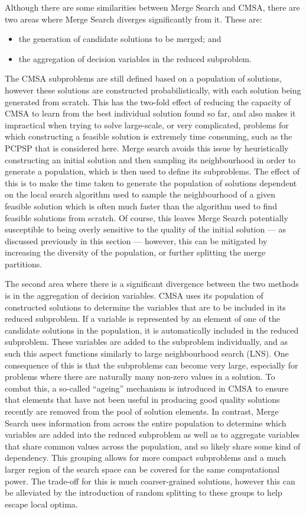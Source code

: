 \documentclass[authoryear,11pt,square,number,times,super,comma]{elsarticle}
\begin{document}
Although there are some similarities between Merge Search and CMSA, there are two areas where Merge Search diverges significantly from it. These are:
\begin{itemize}
\item the generation of candidate solutions to be merged; and
\item the aggregation of decision variables in the reduced subproblem.
\end{itemize}
The CMSA subproblems are still defined based on a population of solutions, however these solutions are constructed probabilistically, with each solution being generated from scratch. This has the two-fold effect of reducing the capacity of CMSA to learn from the best individual solution found so far, and also makes it impractical when trying to solve large-scale, or very complicated, problems for which constructing a feasible solution is extremely time consuming, such as the PCPSP that is considered here. Merge search avoids this issue by heuristically constructing an initial solution and then sampling its neighbourhood in order to generate a population, which is then used to define its subproblems. The effect of this is to make the time taken to generate the population of solutions dependent on the local search algorithm used to sample the neighbourhood of a given feasible solution which is often much faster than the algorithm used to find feasible solutions from scratch. Of course, this leaves Merge Search potentially susceptible to being overly sensitive to the quality of the initial solution --- as discussed previously in this section --- however, this can be mitigated by increasing the diversity of the population, or further splitting the merge partitions. 

The second area where there is a significant divergence between the two methods is in the aggregation of decision variables. CMSA uses its population of constructed solutions to determine the variables that are to be included in its reduced subproblem. If a variable is represented by an element of one of the candidate solutions in the population, it is automatically included in the reduced subproblem. These variables are added to the subproblem individually, and as such this aspect functions similarly to large neighbourhood search (LNS). One consequence of this is that the subproblems can become very large, especially for problems where there are naturally many non-zero values in a solution. To combat this, a so-called ``ageing'' mechanism is introduced in CMSA to ensure that elements that have not been useful in producing good quality solutions recently are removed from the pool of solution elements. In contrast, Merge Search uses information from across the entire population to determine which variables are added into the reduced subproblem as well as to aggregate variables that share common values across the population, and so likely share some kind of dependency. This grouping allows for more compact subproblems and a much larger region of the search space can be covered for the same computational power. The trade-off for this is much coarser-grained solutions, however this can be alleviated by the introduction of random splitting to these groups to help escape local optima.
\end{document}
